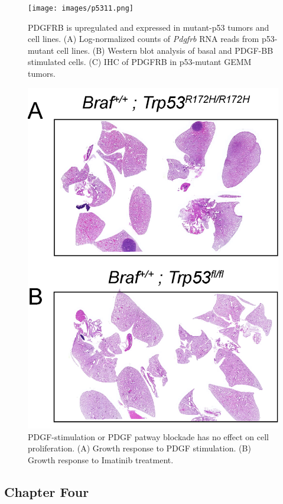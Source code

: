 \begin{figure}
\hypertarget{fig:3.13}{%
\centering
\texttt{[image: images/p5311.png]}
\caption{PDGFRB is upregulated and expressed in mutant-p53 tumors and cell lines. (A) Log-normalized counts of \emph{Pdgfrb} RNA reads from p53-mutant cell lines. (B) Western blot analysis of basal and PDGF-BB stimulated cells. (C) IHC of PDGFRB in p53-mutant GEMM tumors.}\label{fig:3.13}
}
\end{figure}

\begin{figure}
\hypertarget{fig:3.14}{%
\centering
\includegraphics[width=1\textwidth,height=\textheight]{images/p5312.png}
\caption{PDGF-stimulation or PDGF patway blockade has no effect on cell proliferation. (A) Growth response to PDGF stimulation. (B) Growth response to Imatinib treatment.}\label{fig:3.14}
}
\end{figure}

\hypertarget{chapter-four}{%
\subsection{Chapter Four}\label{chapter-four}}

